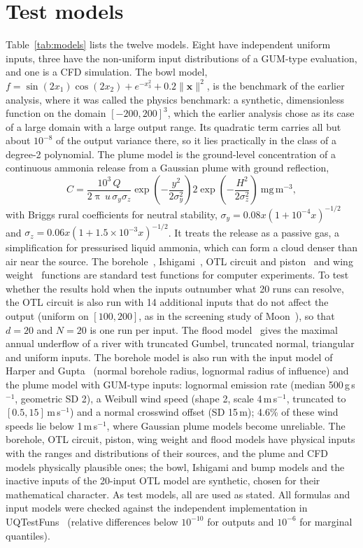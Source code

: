 \section{Test models}
\label{sec:models}
Table~\ref{tab:models} lists the twelve models. Eight have independent uniform
inputs, three have the non-uniform input distributions of a GUM-type
evaluation, and one is a CFD simulation. The bowl model,
$f=\sin(2x_1)\cos(2x_2)+e^{-x_3^2}+0.2\lVert\mathbf x\rVert^2$, is the
benchmark of the earlier analysis, where it was called the physics
benchmark: a synthetic, dimensionless function on the domain
$[-200,200]^3$, which the earlier analysis chose as its case of a large
domain with a large output range. Its quadratic term carries all but about
$10^{-8}$ of the output variance there, so it lies practically in the class
of a degree-2 polynomial. The plume model is the ground-level concentration of a
continuous ammonia release from a Gaussian plume with ground reflection,
\begin{equation}
C=\frac{10^3\,Q}{2\uppi\,u\,\sigma_y\sigma_z}
\exp\!\left(-\frac{y^2}{2\sigma_y^2}\right)
2\exp\!\left(-\frac{H^2}{2\sigma_z^2}\right)\ \mathrm{mg\,m^{-3}},
\end{equation}
with Briggs rural coefficients for neutral stability,
$\sigma_y=0.08x(1+10^{-4}x)^{-1/2}$ and $\sigma_z=0.06x(1+1.5\times10^{-3}x)^{-1/2}$.
It treats the release as a passive gas, a simplification for pressurised
liquid ammonia, which can form a cloud denser than air near the source.
The borehole~\cite{harper1983,morris1993,vlse},
Ishigami~\cite{vlse}, OTL circuit and piston~\cite{benari2007} and wing
weight~\cite{forrester2008} functions are standard test functions for
computer experiments. To test whether the results hold when the inputs
outnumber what 20 runs can resolve, the OTL circuit is also run with 14
additional inputs that do not affect the output (uniform on $[100,200]$,
as in the screening study of Moon~\cite{moon2010}), so that $d=20$ and
$N=20$ is one run per input. The flood
model~\cite{iooss2015} gives the maximal annual underflow of a river with
truncated Gumbel, truncated normal, triangular and uniform inputs. The
borehole model is also run with the input model of Harper and
Gupta~\cite{harper1983} (normal borehole radius, lognormal radius of
influence) and the plume model with GUM-type inputs: lognormal emission rate
(median 500\,g\,s$^{-1}$, geometric SD 2), a Weibull wind speed (shape 2,
scale 4\,m\,s$^{-1}$, truncated to $[0.5,15]$\,m\,s$^{-1}$) and a normal
crosswind offset (SD 15\,m); 4.6\% of these wind speeds lie below
1\,m\,s$^{-1}$, where Gaussian plume models become unreliable. The
borehole, OTL circuit, piston, wing weight and flood models have physical
inputs with the ranges and distributions of their sources, and the plume
and CFD models physically plausible ones; the bowl, Ishigami and bump
models and the inactive inputs of the 20-input OTL model are synthetic,
chosen for their mathematical character. As test models, all are used as
stated. All formulas and input models were checked
against the independent implementation in UQTestFuns~\cite{wicaksono2023}
(relative differences below $10^{-10}$ for outputs and $10^{-6}$ for
marginal quantiles).

